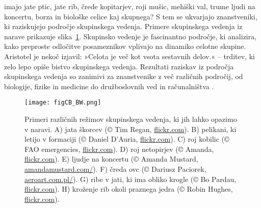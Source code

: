 









\begin{razsirjeniPovzetek}

 imajo jate ptic, jate rib, črede kopitarjev, roji mušic, mehiški val, trume ljudi na koncertu, borza in biološke celice kaj skupnega? S tem se ukvarjajo znanstveniki, ki raziskujejo področje skupinskega vedenja. Primere skupinskega vedenja iz narave prikazuje slika~\ref{fig:CB_si}. Skupinsko vedenje je fascinantno področje, ki analizira, kako preproste odločitve posameznikov vplivajo na dinamiko celotne skupine. Aristotel je nekoč izjavil: »Celota je več kot vsota sestavnih delov.« -- trditev, ki zelo lepo opiše bistvo skupinskega vedenja. Rezultati raziskav iz področja skupinskega vedenja so zanimivi za znanstvenike z več različnih področij, od biologije, fizike in medicine do družboslovnih ved in računalništva \cite{deisboeck2009collective,lebarbajec2009organized,nahin2012chases,silverberg2013collective,spector2003emergence,sumpter2006principles,vicsek1995novel,wei2009pursuit,xu2014crowd}.

\begin{figure}[p]
  \texttt{[image: figCB\_BW.png]}
  \caption{Primeri različnih režimov skupinskega vedenja, ki jih lahko opazimo v naravi. A) jata škorcev (© Tim Regan, \href{www.flickr.com}{flickr.com}). B) pelikani, ki letijo v formaciji (© Daniel D'Auria, \href{www.flickr.com}{flickr.com}). C) roj kobilic (© FAO emergencies, \href{www.flickr.com}{flickr.com}). D) roj netopirjev (© Amanda, \href{www.flickr.com}{flickr.com}). E) ljudje na koncertu (© Amanda Mustard, \href{http://www.amandamustard.com/}{amandamustard.com/}). F) čreda ovc (© Dariusz Paciorek, \href{http://www.aeroart.com.pl/}{aeroart.com.pl/}). G) ribe v jati, ki ima obliko krogle (© Bo Pardau, \href{www.flickr.com}{flickr.com}). H) kroženje rib okoli praznega jedra (© Robin Hughes, \href{www.flickr.com}{flickr.com}).}
  \label{fig:CB_si}
\end{figure}


\end{razsirjeniPovzetek}

